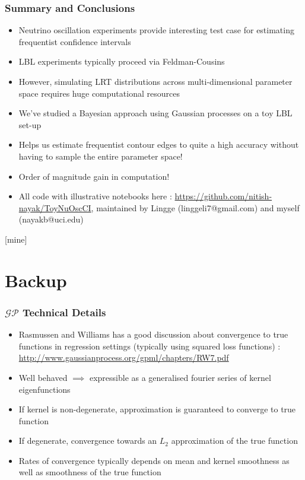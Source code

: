 \documentclass[9pt, aspectratio=169]{beamer}
\begin{document}
\begin{frame}
  \frametitle{Summary and Conclusions}
  \begin{itemize}
    \item Neutrino oscillation experiments provide interesting test case for estimating frequentist confidence intervals
    \item LBL experiments typically proceed via Feldman-Cousins
    \item However, simulating LRT distributions across multi-dimensional parameter space requires huge computational resources
    \item We've studied a Bayesian approach using Gaussian processes on a toy LBL set-up
    \item Helps us estimate frequentist contour edges to quite a high accuracy without having to sample the entire parameter space!
    \item Order of magnitude gain in computation!
    \item All code with illustrative notebooks here : \url{https://github.com/nitish-nayak/ToyNuOscCI}, maintained by Lingge (linggeli7@gmail.com) and myself (nayakb@uci.edu)
  \end{itemize}
\end{frame}

[mine]
\section{Backup}

\begin{frame}
  \frametitle{$\mathcal{GP}$ Technical Details}
  \begin{itemize}
    \item Rasmussen and Williams has a good discussion about convergence to true functions in regression settings (typically using squared loss functions) : \url{http://www.gaussianprocess.org/gpml/chapters/RW7.pdf}
    \item Well behaved $\implies$ expressible as a generalised fourier series of kernel eigenfunctions
    \item If kernel is non-degenerate, approximation is guaranteed to converge to true function 
    \item If degenerate, convergence towards an $L_{2}$ approximation of the true function
    \item Rates of convergence typically depends on mean and kernel smoothness as well as smoothness of the true function
  \end{itemize}
\end{frame}
\end{document}
